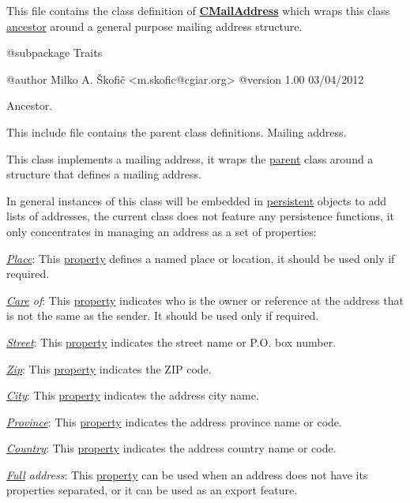 This file contains the class definition of {\bfseries \hyperlink{class_c_mail_address}{C\-Mail\-Address}} which wraps this class \hyperlink{class_c_array_object}{ancestor} around a general purpose mailing address structure.

\begin{DoxyVerb}    @subpackage     Traits

    @author         Milko A. Škofič <m.skofic@cgiar.org>
    @version        1.00 03/04/2012\end{DoxyVerb}


Ancestor.

This include file contains the parent class definitions. Mailing address.

This class implements a mailing address, it wraps the \hyperlink{class_c_array_object}{parent} class around a structure that defines a mailing address.

In general instances of this class will be embedded in \hyperlink{class_c_persistent_object}{persistent} objects to add lists of addresses, the current class does not feature any persistence functions, it only concentrates in managing an address as a set of properties\-:


\begin{DoxyItemize}
\item {\itshape \hyperlink{}{Place}}\-: This \hyperlink{}{property} defines a named place or location, it should be used only if required. 
\item {\itshape \hyperlink{}{Care} of}\-: This \hyperlink{}{property} indicates who is the owner or reference at the address that is not the same as the sender. It should be used only if required. 
\item {\itshape \hyperlink{}{Street}}\-: This \hyperlink{}{property} indicates the street name or P.\-O. box number. 
\item {\itshape \hyperlink{}{Zip}}\-: This \hyperlink{}{property} indicates the Z\-I\-P code. 
\item {\itshape \hyperlink{}{City}}\-: This \hyperlink{}{property} indicates the address city name. 
\item {\itshape \hyperlink{}{Province}}\-: This \hyperlink{}{property} indicates the address province name or code. 
\item {\itshape \hyperlink{}{Country}}\-: This \hyperlink{}{property} indicates the address country name or code. 
\item {\itshape \hyperlink{}{Full} address}\-: This \hyperlink{}{property} can be used when an address does not have its properties separated, or it can be used as an export feature. 
\end{DoxyItemize}

